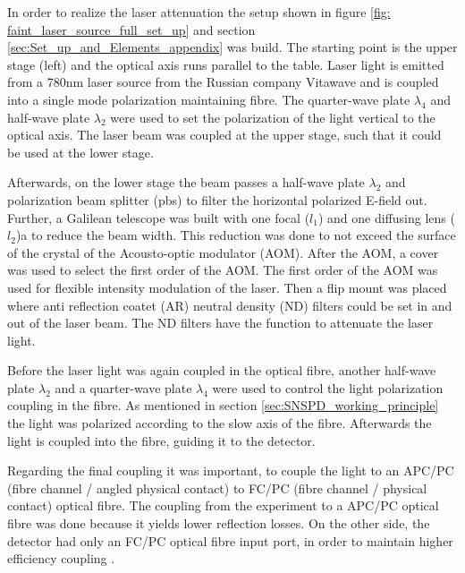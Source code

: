 
In order to realize the laser attenuation the setup shown in figure \ref{fig: faint_laser_source_full_set_up} and section
\ref{sec:Set_up_and_Elements_appendix} was build.
The starting point is the upper stage (left) and the optical axis runs parallel to the table.
Laser light is emitted from a 780nm laser source from the Russian company Vitawave and
is coupled into a single mode polarization maintaining fibre.
The quarter-wave plate $\lambda_4$ and half-wave plate $\lambda_2$ were used to set the polarization of the light vertical
to the optical axis.
The laser beam was coupled at the upper stage, such that it could be used at the lower stage.

Afterwards, on the lower stage the beam passes a half-wave plate $\lambda_2$ and polarization beam splitter (pbs) to filter the horizontal
polarized E-field out.
Further, a Galilean telescope was built with one focal ($l_1$) and one diffusing lens ($l_2$)a to reduce the beam width.
This reduction was done to not exceed the surface of the crystal of the Acousto-optic modulator (AOM).
After the AOM, a cover was used to select the first order of the AOM.
The first order of the AOM was used for flexible intensity modulation of the laser.
Then a flip mount was placed where anti reflection coatet (AR) neutral density (ND) filters could be set in and out of the laser beam.
The ND filters have the function to attenuate the laser light.

Before the laser light was again coupled in the optical fibre, another half-wave plate $\lambda_2$ and a quarter-wave
plate $\lambda_4$ were used to control the light polarization coupling in the fibre.
As mentioned in section \ref{sec:SNSPD_working_principle} the light was polarized according to the slow axis of the fibre.
Afterwards the light is coupled into the fibre, guiding it to the detector.

Regarding the final coupling it was important, to couple the light to an APC/PC (fibre channel / angled physical contact) to FC/PC (fibre channel / physical contact) optical fibre.
The coupling from the experiment to a APC/PC optical fibre was done because it yields lower reflection losses.
On the other side, the detector had only an FC/PC optical fibre input port, in order to maintain higher efficiency coupling \cite{single-quantum-2022}.\\

